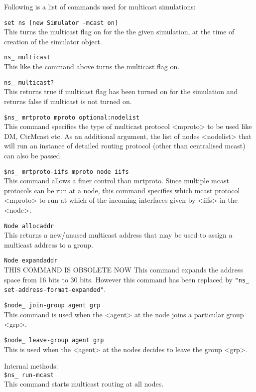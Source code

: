 Following is a list of commands used for multicast simulations:
\begin{flushleft}
{\tt set ns [new Simulator -mcast on]}\\
This turns the multicast flag on for the the given simulation, at the time of
creation of the simulator object.


{\tt ns\_ multicast}\\
This like the command above turns the multicast flag on.


{\tt ns\_ multicast?}\\
This returns true if multicast flag has been turned on for the simulation
and returns false if multicast is not turned on.


{\tt \$ns\_ mrtproto \<mproto\> \<optional:nodelist\>}\\
This command specifies the type of multicast protocol <mproto> to be used
like DM, CtrMcast etc. As an additional argument, the list of nodes <nodelist>
that will run an instance of detailed routing protocol (other than
centralised mcast) can also be passed.


{\tt \$ns\_ mrtproto-iifs \<mproto\> \<node\> \<iifs\>}\\
This command allows a finer control than mrtproto. Since multiple mcast
protocols can be run at a node, this command specifies which mcast protocol
<mproto> to run at which of the incoming interfaces given by <iifs> in the <node>.


{\tt Node allocaddr}\\
This returns a new/unused multicast address that may be used to assign a multicast
address to a group.


{\tt Node expandaddr}\\
THIS COMMAND IS OBSOLETE NOW
This command expands the address space from 16 bits to 30 bits. However this
command has been replaced by {\tt "ns\_ set-address-format-expanded"}.


{\tt \$node\_ join-group \<agent\> \<grp\>}\\
This command is used when the <agent> at the node joins a particular group <grp>.


{\tt \$node\_ leave-group \<agent\> \<grp\>}\\
This is used when the <agent> at the nodes decides to leave the group <grp>.

Internal methods:\\

{\tt \$ns\_ run-mcast}\\
This command starts multicast routing at all nodes. 



\end{flushleft}
